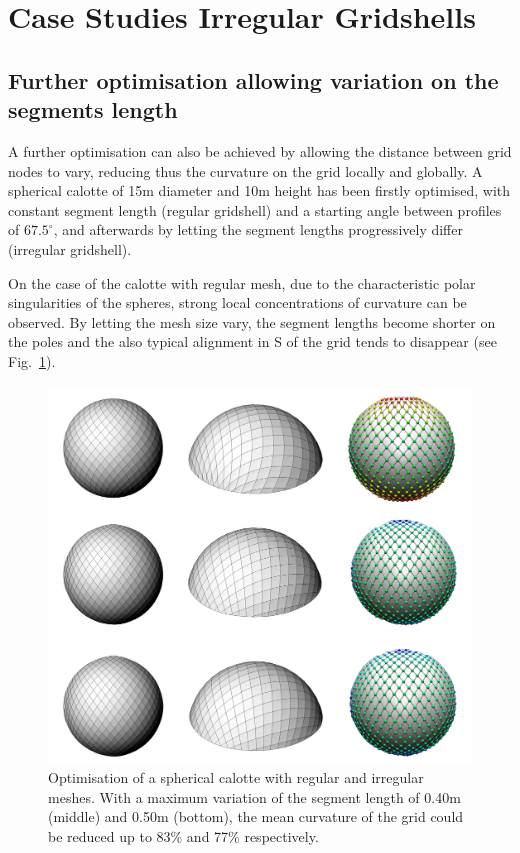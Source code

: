 
\section{Case Studies Irregular Gridshells}

\subsection{Further optimisation allowing variation on the segments length}

A further optimisation can also be achieved by allowing the distance between grid nodes to vary, reducing thus the curvature on the grid locally and globally. A spherical calotte of 15m diameter and 10m height has been firstly optimised, with constant segment length (regular gridshell) and a starting angle between profiles of $67.5^\circ$, and afterwards  by letting the segment lengths progressively differ (irregular gridshell). 

On the case of the calotte with regular mesh, due to the characteristic polar singularities of the spheres, strong local concentrations of curvature can be observed. By letting the mesh size vary, the segment lengths become shorter on the poles and the also typical alignment in S of the grid tends to disappear (see Fig.~\ref{fig:SphereIrregular}).

\begin{figure}[t]
\centering
\includegraphics[width=0.80\linewidth]{images/CaseStudies_Irregular/SphereIrregular.png}
\caption{Optimisation of a spherical calotte with regular and irregular meshes. With a maximum variation of the segment length of 0.40m (middle) and 0.50m (bottom), the mean curvature of the grid could be reduced up to 83\% and 77\% respectively.}
\label{fig:SphereIrregular}
\end{figure}

